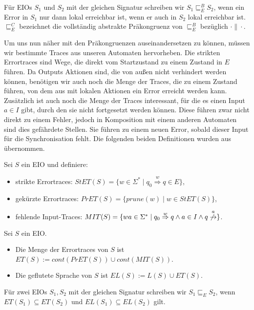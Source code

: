 \begin{Def}
  Für EIOs $S_1$ und $S_2$ mit der gleichen Signatur schreiben wir $S_1\sqsubseteq
  _E^ B S_2$, wenn ein Error in $S_1$ nur dann lokal erreichbar ist, wenn er
  auch in $S_2$ lokal erreichbar ist.\\
  $\sqsubseteq _E^C$ bezeichnet die vollständig abstrakte Präkongruenz von
  $\sqsubseteq _E^B$ bezüglich $\cdot\|\cdot$.
\end{Def}

Um uns nun näher mit den Präkongruenzen auseinandersetzen zu können, müssen wir bestimmte Traces
aus unseren Automaten hervorheben. Die strikten Errortraces sind Wege, die
direkt vom Startzustand zu einem Zustand in $E$ führen. Da Outputs Aktionen
sind, die von außen nicht verhindert werden können, benötigen wir auch noch die
Menge der Traces, die zu einem Zustand führen, von dem aus mit lokalen Aktionen
ein Error erreicht werden kann. Zusätzlich ist auch noch die Menge der Traces
interessant, für die es einen Input $a\in I$ gibt, durch den sie nicht
fortgesetzt werden können. Diese führen zwar nicht
direkt zu einem Fehler, jedoch in Komposition mit einem anderen Automaten sind
dies gefährdete Stellen. Sie führen zu einem neuen Error, sobald dieser Input
für die Synchronisation fehlt. Die folgenden beiden Definitionen wurden
aus~\cite{Vogler2014EIO} übernommen.

\begin{Def}[Errortraces]
  \label{DefErrortraces}
  Sei $S$ ein EIO und definiere:
  \begin{itemize}
    \item strikte Errortraces: $StET(S)=\{w\in\Sigma
      ^*\mid q_0\overset{w}{\Rightarrow}q\in E\}$,
    \item gekürzte Errortraces: $PrET(S)=\{prune(w)\mid w\in StET(S)\}$,
    \item fehlende Input-Traces: $MIT(S)=\{wa\in\Sigma ^*\mid
      q_0\overset{w}{\Rightarrow}q\wedge a\in I\wedge
    q\overset{a}{\not{\hspace{-0.1cm}\rightarrow}}\}$.
  \end{itemize}
\end{Def}

\begin{Def}
  \label{DefETEL}
  Sei $S$ ein EIO.
  \begin{itemize}
    \item Die Menge der Errortraces von $S$ ist $ET(S):=cont(PrET(S))\cup
      cont(MIT(S))$.
    \item Die geflutete Sprache von $S$ ist $EL(S):=L(S)\cup ET(S)$.
  \end{itemize}
  Für zwei EIOs $S_1, S_2$ mit der gleichen Signatur schreiben wir
  $S_1\sqsubseteq _E S_2$, wenn $ET(S_1)\subseteq ET(S_2)$ und
  $EL(S_1)\subseteq EL(S_2)$ gilt.
\end{Def}

